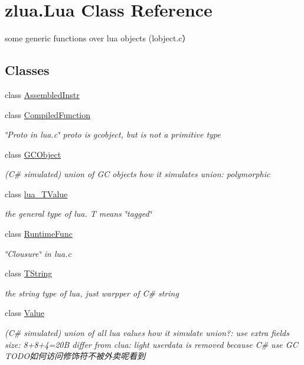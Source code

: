 \hypertarget{classzlua_1_1_lua}{}\section{zlua.\+Lua Class Reference}
\label{classzlua_1_1_lua}


some generic functions over lua objects (lobject.\+c）  


\subsection*{Classes}
\begin{DoxyCompactItemize}
\item 
class \mbox{\hyperlink{classzlua_1_1_lua_1_1_assembled_instr}{Assembled\+Instr}}
\item 
class \mbox{\hyperlink{classzlua_1_1_lua_1_1_compiled_function}{Compiled\+Function}}
\begin{DoxyCompactList}\small\item\em \char`\"{}\+Proto in lua.\+c\char`\"{} proto is gcobject, but is not a primitive type \end{DoxyCompactList}\item 
class \mbox{\hyperlink{classzlua_1_1_lua_1_1_g_c_object}{G\+C\+Object}}
\begin{DoxyCompactList}\small\item\em (C\# simulated) union of GC objects how it simulates union\+: polymorphic \end{DoxyCompactList}\item 
class \mbox{\hyperlink{classzlua_1_1_lua_1_1lua___t_value}{lua\+\_\+\+T\+Value}}
\begin{DoxyCompactList}\small\item\em the general type of lua. T means \char`\"{}tagged\char`\"{} \end{DoxyCompactList}\item 
class \mbox{\hyperlink{classzlua_1_1_lua_1_1_runtime_func}{Runtime\+Func}}
\begin{DoxyCompactList}\small\item\em \char`\"{}\+Clousure\char`\"{} in lua.\+c \end{DoxyCompactList}\item 
class \mbox{\hyperlink{classzlua_1_1_lua_1_1_t_string}{T\+String}}
\begin{DoxyCompactList}\small\item\em the string type of lua, just warpper of C\# string \end{DoxyCompactList}\item 
class \mbox{\hyperlink{classzlua_1_1_lua_1_1_value}{Value}}
\begin{DoxyCompactList}\small\item\em (C\# simulated) union of all lua values how it simulate union?\+: use extra fields size\+: 8+8+4=20B differ from clua\+: light userdata is removed because C\# use GC T\+O\+D\+O如何访问修饰符不被外卖呢看到 \end{DoxyCompactList}\end{DoxyCompactItemize}
